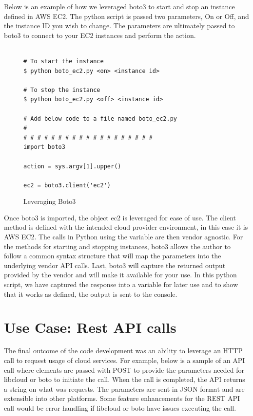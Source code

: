 Below is an example of how we leveraged boto3 to start and stop an instance
defined in AWS EC2. The python script is passed two parameters, On or Off, and
the instance ID you wish to change. The parameters are ultimately passed to
boto3 to connect to your EC2 instances and perform the action.

\begin{figure}[htb]
\begin{verbatim}

# To start the instance
$ python boto_ec2.py <on> <instance id>

# To stop the instance
$ python boto_ec2.py <off> <instance id>

# Add below code to a file named boto_ec2.py
# 
# # # # # # # # # # # # # # # # # # # 
import boto3

action = sys.argv[1].upper()

ec2 = boto3.client('ec2')

\end{verbatim}

\caption{Leveraging Boto3~\cite{hid-sp18-518-Boto3}}\label{c:boto3-example}

\end{figure}

Once boto3 is imported, the object ec2 is leveraged for ease of use. The client
method is defined with the intended cloud provider environment, in this case it
is AWS EC2. The calls in Python using the variable are then vendor agnostic.
For
the methods for starting and stopping instances, boto3 allows the author to
follow a common syntax structure that will map the parameters into the
underlying vendor API calls. Last, boto3 will capture the returned output
provided by the vendor and will make it available for your use. In this python
script, we have captured the response into a variable for later use and to show
that it works as defined, the output is sent to the console.

\section{Use Case: Rest API calls}

The final outcome of the code development was an ability to leverage an HTTP
call to request usage of cloud services. For example, below is a sample of an
API call where elements are passed with POST to provide the parameters needed
for libcloud or boto to initiate the call. When the call is completed, the API
returns a string on what was requests. The parameters are sent in JSON format
and are extensible into other platforms. Some feature enhancements for the REST
API call would be error handling if libcloud or boto have issues executing the
call.  

